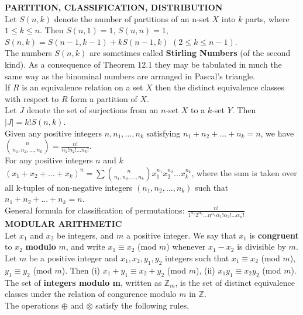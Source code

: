 \documentclass[10pt,landscape]{article}
\begin{document}
\begin{multicols}{4}
\textbf{PARTITION, CLASSIFICATION, DISTRIBUTION}\\
Let $S(n,k)$ denote the number of partitions of an n-set $X$ into $k$
parts, where $1 \leq k \leq n$. Then $S(n,1) = 1$, $S(n,n) = 1$,
$S(n,k) = S(n-1, k-1) + kS(n-1,k)$ $(2 \leq k \leq n-1)$.\\
The numbers $S(n,k)$ are sometimes called \textbf{Stirling Numbers}
(of the second kind). As a consequence of Theorem 12.1 they may be
tabulated in much the same way as the binominal numbers are arranged
in Pascal's triangle.\\
If $R$ is an equivalence relation on a set $X$ then the distinct
equivalence classes with respect to $R$ form a partition of $X$.\\
Let $J$ denote the set of surjections from an $n$-set $X$ to a $k$-set
$Y$. Then $|J| = k!S(n,k)$.\\
Given any positive integers $n, n_{1}, \dots ,n_{k}$ satisfying
$n_{1} + n_{2} + \dots + n_{k} = n$, we have
$\binom{n}{n_{1},n_{2},\dots,n_{k}}=\frac{n!}{n_{1}!n_{2}!\dots
  n_{k}!}$.\\
For any positive integers $n$ and $k$ $(x_{1}+ x_{2} + \dots
+ x_{k})^{n} = \sum \binom{n}{n_{1},n_{2}, \dots
  ,n_{k}} x_{1}^{n_{1}} x_{2}^{n_{2}} \dots x_{k}^{n_{k}}$, where the sum
    is taken over all k-tuples of non-negative integers $(n_{1},
    n_{2}, \dots, n_{k})$ such that $n_{1}+n_{2}+ \dots + n_{k} =
    n$.\\
General formula for classification of permutations:
$\frac{n!}{1^{\alpha_{1}}2^{\alpha_{2}}\dots
  n^{\alpha_{n}}\alpha_{1}!\alpha_{2}!\dots \alpha_{n}!}$\\
\textbf{MODULAR ARITHMETIC}\\
Let $x_{1}$ and $x_{2}$ be integers, and $m$ a positive integer. We
say that $x_{1}$ is \textbf{congruent} to $x_{2}$ \textbf{modulo} $m$,
and write $x_{1} \equiv x_{2}$ (mod $m$) whenever $x_{1} - x_{2}$ is
divisible by $m$.\\
Let $m$ be a positive integer and $x_{1}, x_{2}, y_{1}, y_{2}$
integers such that $x_{1} \equiv x_{2}$ (mod $m$), $y_{1} \equiv y_{2}$
(mod $m$). Then (i) $x_{1} + y_{1} \equiv x_{2} + y_{2}$ (mod $m$), (ii)
$x_{1}y_{1} \equiv x_{2}y_{2}$ (mod $m$).\\
The set of \textbf{integers modulo m}, written as $\mathbb{Z}_{m}$, is
the set of distinct equivalence classes under the relation of
congurence modulo $m$ in $\mathbb{Z}$.\\
The operations $\oplus$ and $\otimes$ satisfy the following rules,

\end{multicols}
\end{document}
